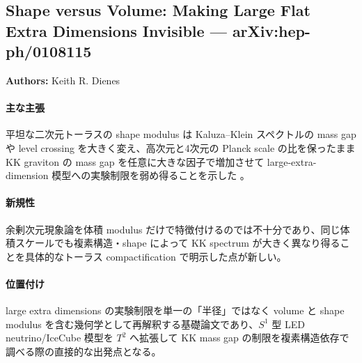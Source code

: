 \subsection{Shape versus Volume: Making Large Flat Extra Dimensions Invisible --- arXiv:hep-ph/0108115}

\textbf{Authors:} Keith R. Dienes

\paragraph{主な主張}
平坦な二次元トーラスの shape modulus は Kaluza--Klein スペクトルの mass gap や level crossing を大きく変え、高次元と4次元の Planck scale の比を保ったまま KK graviton の mass gap を任意に大きな因子で増加させて large-extra-dimension 模型への実験制限を弱め得ることを示した \cite{Dienes:2001shape}。

\paragraph{新規性}
余剰次元現象論を体積 modulus だけで特徴付けるのでは不十分であり、同じ体積スケールでも複素構造・shape によって KK spectrum が大きく異なり得ることを具体的なトーラス compactification で明示した点が新しい。

\paragraph{位置付け}
large extra dimensions の実験制限を単一の「半径」ではなく volume と shape modulus を含む幾何学として再解釈する基礎論文であり、$S^1$ 型 LED neutrino/IceCube 模型を $T^2$ へ拡張して KK mass gap の制限を複素構造依存で調べる際の直接的な出発点となる。
